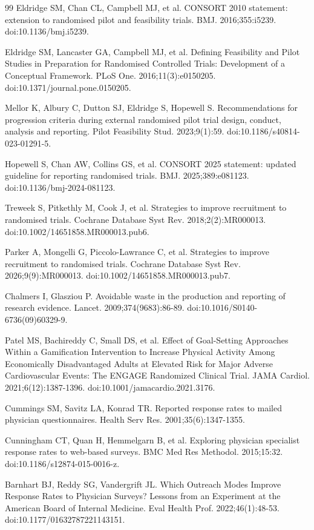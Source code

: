 \documentclass[11pt,a4paper]{article}
\begin{document}
\begin{thebibliography}{99}
 Eldridge SM, Chan CL, Campbell MJ, et al. CONSORT 2010 statement: extension to randomised pilot and feasibility trials. BMJ. 2016;355:i5239. doi:10.1136/bmj.i5239.

 Eldridge SM, Lancaster GA, Campbell MJ, et al. Defining Feasibility and Pilot Studies in Preparation for Randomised Controlled Trials: Development of a Conceptual Framework. PLoS One. 2016;11(3):e0150205. doi:10.1371/journal.pone.0150205.

 Mellor K, Albury C, Dutton SJ, Eldridge S, Hopewell S. Recommendations for progression criteria during external randomised pilot trial design, conduct, analysis and reporting. Pilot Feasibility Stud. 2023;9(1):59. doi:10.1186/s40814-023-01291-5.

 Hopewell S, Chan AW, Collins GS, et al. CONSORT 2025 statement: updated guideline for reporting randomised trials. BMJ. 2025;389:e081123. doi:10.1136/bmj-2024-081123.

 Treweek S, Pitkethly M, Cook J, et al. Strategies to improve recruitment to randomised trials. Cochrane Database Syst Rev. 2018;2(2):MR000013. doi:10.1002/14651858.MR000013.pub6.

 Parker A, Mongelli G, Piccolo-Lawrance C, et al. Strategies to improve recruitment to randomised trials. Cochrane Database Syst Rev. 2026;9(9):MR000013. doi:10.1002/14651858.MR000013.pub7.

 Chalmers I, Glasziou P. Avoidable waste in the production and reporting of research evidence. Lancet. 2009;374(9683):86-89. doi:10.1016/S0140-6736(09)60329-9.

 Patel MS, Bachireddy C, Small DS, et al. Effect of Goal-Setting Approaches Within a Gamification Intervention to Increase Physical Activity Among Economically Disadvantaged Adults at Elevated Risk for Major Adverse Cardiovascular Events: The ENGAGE Randomized Clinical Trial. JAMA Cardiol. 2021;6(12):1387-1396. doi:10.1001/jamacardio.2021.3176.

 Cummings SM, Savitz LA, Konrad TR. Reported response rates to mailed physician questionnaires. Health Serv Res. 2001;35(6):1347-1355.

 Cunningham CT, Quan H, Hemmelgarn B, et al. Exploring physician specialist response rates to web-based surveys. BMC Med Res Methodol. 2015;15:32. doi:10.1186/s12874-015-0016-z.

 Barnhart BJ, Reddy SG, Vandergrift JL. Which Outreach Modes Improve Response Rates to Physician Surveys? Lessons from an Experiment at the American Board of Internal Medicine. Eval Health Prof. 2022;46(1):48-53. doi:10.1177/01632787221143151.


\end{thebibliography}
\end{document}
